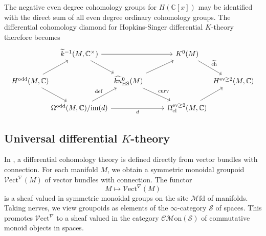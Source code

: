 \documentclass[a4paper]{book}
\newcommand{\lC}{\mathcal{C}}
\newcommand{\bC}{\mathbb{C}}
\newcommand{\lM}{\mathcal{M}}
\newcommand{\lS}{\mathcal{S}}
\newcommand{\lV}{\mathcal{V}}
\newcommand{\bZ}{\mathbb{Z}}
\newcommand{\Mon}{\lM\mathrm{on}} %
\newcommand{\CMon}{\lC\Mon} %
\newcommand{\ch}{\mathrm{ch}}
\newcommand{\Mfd}{\lM\mathrm{fd}} %
\newcommand{\Vect}{\lV\mathrm{ect}} %
\theoremstyle{definition}
\theoremstyle{remark}
\numberwithin{equation}{section}
\begin{document}
The negative even degree cohomology groups for $H(\bC[x])$ may be identified with the direct sum of all even degree ordinary cohomology groups. The differential cohomology diamond for Hopkins-Singer differential $K$-theory therefore becomes
\begin{equation*}
\begin{tikzcd}[column sep=0cm]
&[-0.2cm] 
\widetilde{k}{}^{-1}(M, \bC^\times)
\ar[dr]\ar[rr]
& &[0.9cm]
K^0(M) 
\ar[dr, "\widetilde{\ch}"] 
&
\\ 	
H^{\mathrm{odd}}(M, \bC)
\ar[ur]
\ar[dr]
& & 
\widehat{ku}{}_{\mathrm{HS}}^0(M) 
\ar[ur]
\ar[dr, "\mathrm{curv}"]
& & 
H^{\mathrm{ev} \geq 2}(M, \bC)
\\
& 
\Omega^{\mathrm{odd}}(M, \bC)/\mathrm{im}(d)
\ar[ur, "\mathrm{def}"]
\ar[rr, "d"']
& & 
\Omega_{\mathrm{cl}}^{\mathrm{ev} \geq 2}(M, \bC)
\ar[ur]
&
\end{tikzcd}
\end{equation*}


\subsection{Universal differential \texorpdfstring{$K$}{K}-theory}
In \cite{bunkenikolausvoelkl2016diffcoh}, a differential cohomology theory is defined directly from vector bundles with connection. For each manifold $M$, we obtain a symmetric monoidal groupoid $\Vect^\nabla(M)$ of vector bundles with connection. The functor
\[
M \longmapsto \Vect^\nabla(M)
\]
is a sheaf valued in symmetric monoidal groups on the site $\Mfd$ of manifolds. Taking nerves, we view groupoids as elements of the $\infty$-category $\lS$ of spaces. This promotes $\Vect^\nabla$ to a sheaf valued in the category $\CMon(\lS)$ of commutative monoid objects in spaces.
\end{document}
